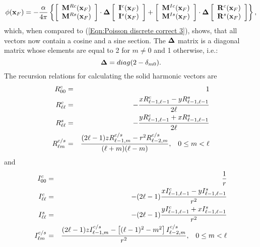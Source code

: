\begin{equation}
\label{Eqn:Poisson discrete correct real}
\phi({\bf x}_F) = -{\alpha\over 4\pi}\left\{
\left[\begin{array}{l}
{\bf M}^{Rc}({\bf x}_F) \\
{\bf M}^{Rs}({\bf x}_F)
\end{array}\right]
\cdot {\bf \Delta}
\left[\begin{array}{l}
{\bf I}^c({\bf x}_F) \\
{\bf I}^s({\bf x}_F)
\end{array}\right]
+
\left[\begin{array}{l}
{\bf M}^{Ic}({\bf x}_F) \\
{\bf M}^{Is}({\bf x}_F)
\end{array}\right]
\cdot {\bf \Delta}
\left[\begin{array}{l}
{\bf R}^c({\bf x}_F) \\
{\bf R}^s({\bf x}_F)
\end{array}\right]\right\},
\end{equation}
which, when compared to (\ref{Eqn:Poisson discrete correct 3}), shows, that all vectors now
contain a cosine and a sine section. The ${\bf \Delta}$ matrix is a diagonal matrix whose elements
are equal to 2 for $m\neq 0$ and 1 otherwise, i.e.:
\begin{equation}
\label{Eqn:Delta matrix}
{\bf \Delta} = diag(2-\delta_{m0}).
\end{equation}
The recursion relations for calculating the solid harmonic vectors are
\begin{eqnarray}
R_{00}^c & = & 1 \label{Eqn:Regular Recurrence} \\
R_{\ell\ell}^c & = & - {xR_{\ell-1,\ell-1}^c-yR_{\ell-1,\ell-1}^s\over 2\ell}\\
R_{\ell\ell}^s & = & - {yR_{\ell-1,\ell-1}^c+xR_{\ell-1,\ell-1}^s\over 2\ell}\\
R_{\ell m}^{c/s} & = & {(2\ell - 1)zR_{\ell-1,m}^{c/s}-r^2R_{\ell-2,m}^{c/s}
                       \over (\ell + m)(\ell - m)},\;\;\;0\leq m <\ell
\end{eqnarray}
and
\begin{eqnarray}
I_{00}^c & = & {1\over r} \\
I_{\ell\ell}^c & = & - (2\ell-1){xI_{\ell-1,\ell-1}^c-yI_{\ell-1,\ell-1}^s\over r^2} \\
I_{\ell\ell}^s & = & - (2\ell-1){yI_{\ell-1,\ell-1}^c+xI_{\ell-1,\ell-1}^s\over r^2} \\
I_{\ell m}^{c/s} & = & {(2\ell - 1)zI_{\ell-1,m}^{c/s}-\left[(\ell-1)^2-m^2\right]
                       I_{\ell-2,m}^{c/s}\over r^2},\;\;\;0\leq m <\ell
\label{Eqn:Irregular Recurrence}
\end{eqnarray}
